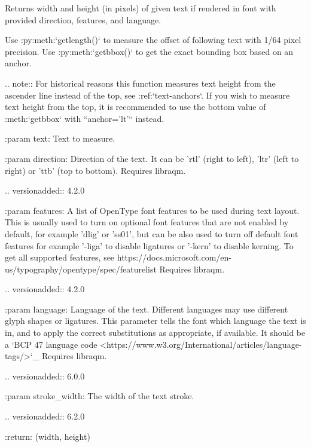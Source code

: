 \begin{DoxyVerb}Returns width and height (in pixels) of given text if rendered in font with
provided direction, features, and language.

Use :py:meth:`getlength()` to measure the offset of following text with
1/64 pixel precision.
Use :py:meth:`getbbox()` to get the exact bounding box based on an anchor.

.. note:: For historical reasons this function measures text height from
    the ascender line instead of the top, see :ref:`text-anchors`.
    If you wish to measure text height from the top, it is recommended
    to use the bottom value of :meth:`getbbox` with ``anchor='lt'`` instead.

:param text: Text to measure.

:param direction: Direction of the text. It can be 'rtl' (right to
          left), 'ltr' (left to right) or 'ttb' (top to bottom).
          Requires libraqm.

          .. versionadded:: 4.2.0

:param features: A list of OpenType font features to be used during text
         layout. This is usually used to turn on optional
         font features that are not enabled by default,
         for example 'dlig' or 'ss01', but can be also
         used to turn off default font features for
         example '-liga' to disable ligatures or '-kern'
         to disable kerning.  To get all supported
         features, see
         https://docs.microsoft.com/en-us/typography/opentype/spec/featurelist
         Requires libraqm.

         .. versionadded:: 4.2.0

:param language: Language of the text. Different languages may use
         different glyph shapes or ligatures. This parameter tells
         the font which language the text is in, and to apply the
         correct substitutions as appropriate, if available.
         It should be a `BCP 47 language code
         <https://www.w3.org/International/articles/language-tags/>`_
         Requires libraqm.

         .. versionadded:: 6.0.0

:param stroke_width: The width of the text stroke.

         .. versionadded:: 6.2.0

:return: (width, height)
\end{DoxyVerb}
 \mbox{\label{classPIL_1_1ImageFont_1_1FreeTypeFont_a7b763fb0d4e667abcc91eb4ee193d783}} 
